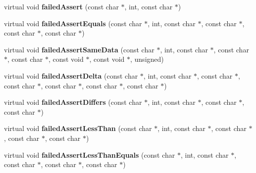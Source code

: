 \begin{DoxyCompactItemize}
\item 
\hypertarget{classCxxTest_1_1TestListener_a102b17aeac413a5c89ced730c61d375e}{virtual void {\bfseries failed\-Assert} (const char $\ast$, int, const char $\ast$)}\label{classCxxTest_1_1TestListener_a102b17aeac413a5c89ced730c61d375e}

\item 
\hypertarget{classCxxTest_1_1TestListener_aefb579e680da9fd809b92f24003dec0b}{virtual void {\bfseries failed\-Assert\-Equals} (const char $\ast$, int, const char $\ast$, const char $\ast$, const char $\ast$, const char $\ast$)}\label{classCxxTest_1_1TestListener_aefb579e680da9fd809b92f24003dec0b}

\item 
\hypertarget{classCxxTest_1_1TestListener_a0e3d3e09d433ce94ff0749c356e9a3a5}{virtual void {\bfseries failed\-Assert\-Same\-Data} (const char $\ast$, int, const char $\ast$, const char $\ast$, const char $\ast$, const void $\ast$, const void $\ast$, unsigned)}\label{classCxxTest_1_1TestListener_a0e3d3e09d433ce94ff0749c356e9a3a5}

\item 
\hypertarget{classCxxTest_1_1TestListener_af804597448d2ffea788153f035b6c5ec}{virtual void {\bfseries failed\-Assert\-Delta} (const char $\ast$, int, const char $\ast$, const char $\ast$, const char $\ast$, const char $\ast$, const char $\ast$, const char $\ast$)}\label{classCxxTest_1_1TestListener_af804597448d2ffea788153f035b6c5ec}

\item 
\hypertarget{classCxxTest_1_1TestListener_a272f90ba43db91876c3f3e039758c1c2}{virtual void {\bfseries failed\-Assert\-Differs} (const char $\ast$, int, const char $\ast$, const char $\ast$, const char $\ast$)}\label{classCxxTest_1_1TestListener_a272f90ba43db91876c3f3e039758c1c2}

\item 
\hypertarget{classCxxTest_1_1TestListener_ae914eec55e91c7c9e9fe2cf5c9d1dbce}{virtual void {\bfseries failed\-Assert\-Less\-Than} (const char $\ast$, int, const char $\ast$, const char $\ast$, const char $\ast$, const char $\ast$)}\label{classCxxTest_1_1TestListener_ae914eec55e91c7c9e9fe2cf5c9d1dbce}

\item 
\hypertarget{classCxxTest_1_1TestListener_ad7720ffe404bbc3a927d0e6896d07241}{virtual void {\bfseries failed\-Assert\-Less\-Than\-Equals} (const char $\ast$, int, const char $\ast$, const char $\ast$, const char $\ast$, const char $\ast$)}\label{classCxxTest_1_1TestListener_ad7720ffe404bbc3a927d0e6896d07241}


\end{DoxyCompactItemize}
